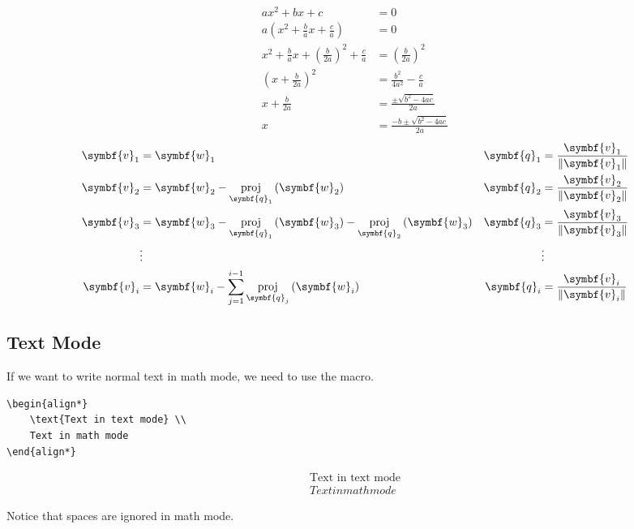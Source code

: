 \documentclass[11pt, twoside]{article}
\DeclareMathOperator{\proj}{proj}
\begin{document}
\begin{align}
    ax^2 + bx + c                                                    & = 0                                  \\
    a\left( x^2 + \frac{b}{a}x + \frac{c}{a} \right)                 & = 0                                  \\
    x^2 + \frac{b}{a}x + \left( \frac{b}{2a} \right)^2 + \frac{c}{a} & = \left( \frac{b}{2a} \right)^2      \\
    \left( x + \frac{b}{2a} \right)^2                                & = \frac{b^2}{4a^2} - \frac{c}{a}     \\
    x + \frac{b}{2a}                                                 & = \frac{\pm \sqrt{b^2 - 4ac}}{2a}    \\
    x                                                                & = \frac{-b \pm \sqrt{b^2 - 4ac}}{2a}
\end{align}
\begin{align*}
    \symbf{v}_1 & = \symbf{w}_1                                                                                                   & \symbf{q}_1 & = \frac{\symbf{v}_1}{\norm{\symbf{v}_1}} \\
    \symbf{v}_2 & = \symbf{w}_2 - \proj_{\symbf{q}_1} \left( \symbf{w}_2 \right)                                                  & \symbf{q}_2 & = \frac{\symbf{v}_2}{\norm{\symbf{v}_2}} \\
    \symbf{v}_3 & = \symbf{w}_3 - \proj_{\symbf{q}_1} \left( \symbf{w}_3 \right) - \proj_{\symbf{q}_2} \left( \symbf{w}_3 \right) & \symbf{q}_3 & = \frac{\symbf{v}_3}{\norm{\symbf{v}_3}} \\
                & \vdots                                                                                                          &             & \vdots                                   \\
    \symbf{v}_i & = \symbf{w}_i - \sum_{j = 1}^{i - 1} \proj_{\symbf{q}_j} \left( \symbf{w}_i \right)                             & \symbf{q}_i & = \frac{\symbf{v}_i}{\norm{\symbf{v}_i}}
\end{align*}
\pagebreak
\subsection{Text Mode}
If we want to write normal text in math mode, we need to use the
\texttt{\text} macro.
\begin{verbatim}
\begin{align*}
    \text{Text in text mode} \\
    Text in math mode
\end{align*}
\end{verbatim}
\begin{outputbox}
    \begin{align*}
        \text{Text in text mode} \\
        Text in math mode
    \end{align*}
\end{outputbox}
Notice that spaces are ignored in math mode.
\end{document}
